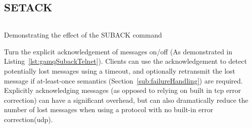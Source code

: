 \subsection{SETACK}
\label{sub:setackCommand}

\begin{listing}[H]
  \centering
  \inputminted{bash}{code/gamqSetackOutput}
  \caption{Demonstrating the effect of the SUBACK command}
  \label{lst:gamqSubackTelnet}
\end{listing}

Turn the explicit acknowledgement of messages on/off (As demonstrated in
Listing~\ref{lst:gamqSubackTelnet}). Clients can use the acknowledgement to
detect potentially lost messages using a timeout, and optionally retransmit the
lost message if at-least-once semantics (Section~\ref{sub:failureHandling}) are
required. Explicitly acknowledging messages (as opposed to relying on built in
\gls{tcp} error correction) can have a significant overhead, but can also
dramatically reduce the number of lost messages when using a protocol with no
built-in error correction(\gls{udp}).
